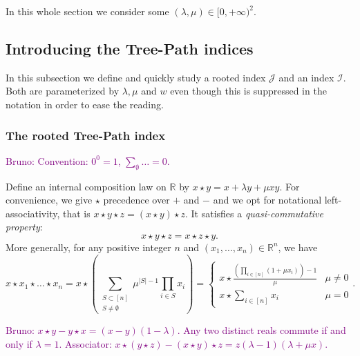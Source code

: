 \documentclass[11 pt]{modarticle}
\newcommand{\cR}{\mathbb{R}}
\newcommand{\wmap}{w}
\newcommand{\indexsymbol}{\mathcal{I}}
\newcommand{\rindexsymbol}{\mathcal{J}}
\newcommand{\bldcomment}[1]{\textcolor{purple}{{\footnotesize Bruno:} #1}}
\begin{document}
In this whole section we consider some $(\lambda, \mu) \in [0,+\infty)^2$.


\subsection{Introducing the Tree-Path indices}

In this subsection we define and quickly study a rooted index $\rindexsymbol$ and an index $\indexsymbol$. Both are parameterized by $\lambda, \mu$ and $\wmap$ even though this is suppressed in the notation in order to ease the reading.

\subsubsection{The rooted Tree-Path index}
\bldcomment{Convention: $0^0=1$, $\sum_\emptyset \dots = 0$.}

Define an internal composition law on $\cR$ by $x \star y =  x + \lambda y + \mu x y$. For convenience, we give $\star$ precedence over $+$ and $-$ and we opt for notational left-associativity, that is $x\star y \star z = (x \star y) \star z$.  It satisfies a \emph{quasi-commutative property}: 
\begin{equation}
    x \star y \star z = x \star z \star y.\label{eq:commutativity}
\end{equation}  
More generally, for any positive integer $n$ and $(x_1,\dots,x_n)\in \cR^n$, we have
\[ x \star x_1 \star \dots \star x_n = x \star \left(\sum_{\substack{S \subset [n]\\S\neq \emptyset}} \mu^{|S|-1} \prod_{i\in S} x_i \right)
= \begin{cases} x \star \frac{ \left( \prod_{i\in [n]} (1 + \mu x_i) \right)- 1}{\mu}  & \mu \neq 0\\
x \star  \sum_{i\in [n]} x_i  & \mu = 0 \end{cases}.
\]




\bldcomment{$x \star y - y \star x = (x - y)(1 - \lambda)$.  Any two distinct reals commute if and only if $\lambda=1$. Associator: $x \star(y\star z) - (x\star y) \star z = z (\lambda - 1)(\lambda + \mu x)$.}
\end{document}
